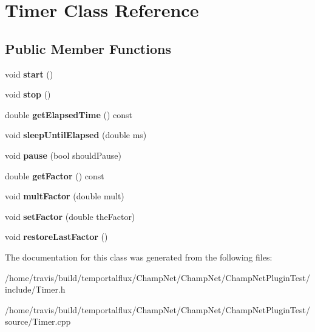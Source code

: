 \hypertarget{class_timer}{\section{Timer Class Reference}
\label{class_timer}
}
\subsection*{Public Member Functions}
\begin{DoxyCompactItemize}
\item 
\hypertarget{class_timer_a3a8b5272198d029779dc9302a54305a8}{void {\bfseries start} ()}\label{class_timer_a3a8b5272198d029779dc9302a54305a8}

\item 
\hypertarget{class_timer_a63f0eb44b27402196590a03781515dba}{void {\bfseries stop} ()}\label{class_timer_a63f0eb44b27402196590a03781515dba}

\item 
\hypertarget{class_timer_ad306e18f8d8a0296e001683f92d7f86e}{double {\bfseries get\-Elapsed\-Time} () const }\label{class_timer_ad306e18f8d8a0296e001683f92d7f86e}

\item 
\hypertarget{class_timer_a918584568a93c6cff18e3fddca0c1d44}{void {\bfseries sleep\-Until\-Elapsed} (double ms)}\label{class_timer_a918584568a93c6cff18e3fddca0c1d44}

\item 
\hypertarget{class_timer_a3697dc7e11780a904fee957f2f1b2a36}{void {\bfseries pause} (bool should\-Pause)}\label{class_timer_a3697dc7e11780a904fee957f2f1b2a36}

\item 
\hypertarget{class_timer_ac2e8200d547385c0bff2d836716b0a2d}{double {\bfseries get\-Factor} () const }\label{class_timer_ac2e8200d547385c0bff2d836716b0a2d}

\item 
\hypertarget{class_timer_a0e116daa696f3d5cd9dc3d2092606761}{void {\bfseries mult\-Factor} (double mult)}\label{class_timer_a0e116daa696f3d5cd9dc3d2092606761}

\item 
\hypertarget{class_timer_a0da285550f750a5ba6c16e5766785883}{void {\bfseries set\-Factor} (double the\-Factor)}\label{class_timer_a0da285550f750a5ba6c16e5766785883}

\item 
\hypertarget{class_timer_a7e8da31c3ef153c7b89ea971a4674476}{void {\bfseries restore\-Last\-Factor} ()}\label{class_timer_a7e8da31c3ef153c7b89ea971a4674476}

\end{DoxyCompactItemize}


The documentation for this class was generated from the following files\-:\begin{DoxyCompactItemize}
\item 
/home/travis/build/temportalflux/\-Champ\-Net/\-Champ\-Net/\-Champ\-Net\-Plugin\-Test/include/Timer.\-h\item 
/home/travis/build/temportalflux/\-Champ\-Net/\-Champ\-Net/\-Champ\-Net\-Plugin\-Test/source/Timer.\-cpp\end{DoxyCompactItemize}
